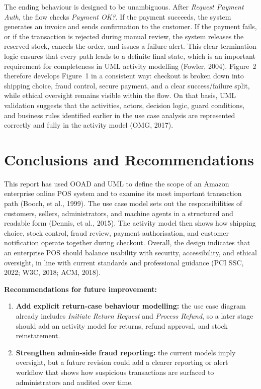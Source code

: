 \documentclass[11pt,a4paper]{article}
\begin{document}
The ending behaviour is designed to be unambiguous. After \textit{Request Payment Auth}, the flow checks \textit{Payment OK?}. If the payment succeeds, the system generates an invoice and sends confirmation to the customer. If the payment fails, or if the transaction is rejected during manual review, the system releases the reserved stock, cancels the order, and issues a failure alert. This clear termination logic ensures that every path leads to a definite final state, which is an important requirement for completeness in UML activity modelling (Fowler, 2004). Figure~2 therefore develops Figure~1 in a consistent way: checkout is broken down into shipping choice, fraud control, secure payment, and a clear success/failure split, while ethical oversight remains visible within the flow. On that basis, UML validation suggests that the activities, actors, decision logic, guard conditions, and business rules identified earlier in the use case analysis are represented correctly and fully in the activity model (OMG, 2017).

\section{Conclusions and Recommendations}

This report has used OOAD and UML to define the scope of an Amazon enterprise online POS system and to examine its most important transaction path (Booch, et al., 1999). The use case model sets out the responsibilities of customers, sellers, administrators, and machine agents in a structured and readable form (Dennis, et al., 2015). The activity model then shows how shipping choice, stock control, fraud review, payment authorisation, and customer notification operate together during checkout. Overall, the design indicates that an enterprise POS should balance usability with security, accessibility, and ethical oversight, in line with current standards and professional guidance (PCI SSC, 2022; W3C, 2018; ACM, 2018).

\textbf{Recommendations for future improvement:}
\begin{enumerate}
\item \textbf{Add explicit return-case behaviour modelling:} the use case diagram already includes \textit{Initiate Return Request} and \textit{Process Refund}, so a later stage should add an activity model for returns, refund approval, and stock reinstatement.
\item \textbf{Strengthen admin-side fraud reporting:} the current models imply oversight, but a future revision could add a clearer reporting or alert workflow that shows how suspicious transactions are surfaced to administrators and audited over time.
\end{enumerate}
\end{document}
